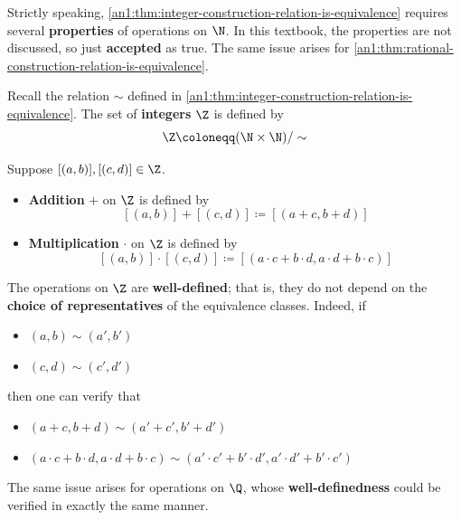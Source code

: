 \begin{remark}
  Strictly speaking, \cref{an1:thm:integer-construction-relation-is-equivalence} requires several
  \textbf{properties} of operations on $\N$. In this textbook, the properties are not discussed, so just
  \textbf{accepted} as true. The same issue arises for \cref{an1:thm:rational-construction-relation-is-equivalence}.
\end{remark}

\begin{definition} \label{an1:def:integer-number-system}
  Recall the relation $\sim$ defined in \cref{an1:thm:integer-construction-relation-is-equivalence}.
  The set of \textbf{integers} $\Z$ is defined by
  \[
    \Z \coloneqq (\N \times \N) / \sim
  \]
\end{definition}

\begin{definition} \label{an1:def:operations-on-Z}
  Suppose $[(a, b)], [(c, d)] \in \Z$.
  \begin{itemize}
    \item \textbf{Addition} $+$ on $\Z$ is defined by
          \[
            [(a, b)] + [(c, d)] \coloneqq [(a + c, b + d)]
          \]
    \item \textbf{Multiplication} $\cdot$ on $\Z$ is defined by
          \[
            [(a, b)] \cdot [(c, d)] \coloneqq [(a \cdot c + b \cdot d, a \cdot d + b \cdot c)]
          \]
  \end{itemize}
\end{definition}

\begin{remark}
  The operations on $\Z$ are \textbf{well-defined}; that is, they do not depend on the
  \textbf{choice of representatives} of the equivalence classes. Indeed, if
  \begin{itemize}
    \item $(a, b) \sim (a', b')$
    \item $(c, d) \sim (c', d')$
  \end{itemize}
  then one can verify that
  \begin{itemize}
    \item $(a + c, b + d) \sim (a' + c', b' + d')$
    \item $(a \cdot c + b \cdot d, a \cdot d + b \cdot c)
            \sim (a' \cdot c' + b' \cdot d', a' \cdot d' + b' \cdot c')$
  \end{itemize}
  The same issue arises for operations on $\Q$, whose \textbf{well-definedness}
  could be verified in exactly the same manner.
\end{remark}

